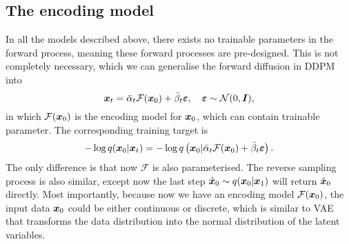 \subsection{The encoding model}
In all the models described above, there exists no trainable parameters in the forward process, meaning these forward processes are pre-designed. This is not completely necessary, which we can generalise the forward diffusion in DDPM into 
\begin{equation}
    \label{eq:11.17}
    \bm{x}_{t}=\bar{\alpha}_t \mathcal{F}(\bm{x}_0)+\bar{\beta}_t\bm{\varepsilon},\quad \bm{\varepsilon}\sim \mathcal{N}(0,\bm{I}),
\end{equation}
in which $\mathcal{F}(\bm{x}_0)$ is the encoding model for $\bm{x}_0$, which can contain trainable parameter. The corresponding training target is 
\begin{equation}
    \label{eq:11.18}
    -\log q(\bm{x}_0|\bm{x}_{t})=-\log q\left(\bm{x}_0| \bar{\alpha}_t \mathcal{F}(\bm{x}_0)+\bar{\beta}_t\bm{\varepsilon}\right).
\end{equation}
The only difference is that now $\mathcal{F}$ is also parameterised. The reverse sampling process is also similar, except now the last step $\hat{\bm{x}}_0\sim q(\bm{x}_0|\bm{x}_1)$ will return $\hat{\bm{x}}_0$ directly. Most importantly, because now we have an encoding model $\mathcal{F}(\bm{x}_0)$, the input data $\bm{x}_0$ could be either continuous or discrete, which is similar to VAE that transforms the data distribution into the normal distribution of the latent variables.